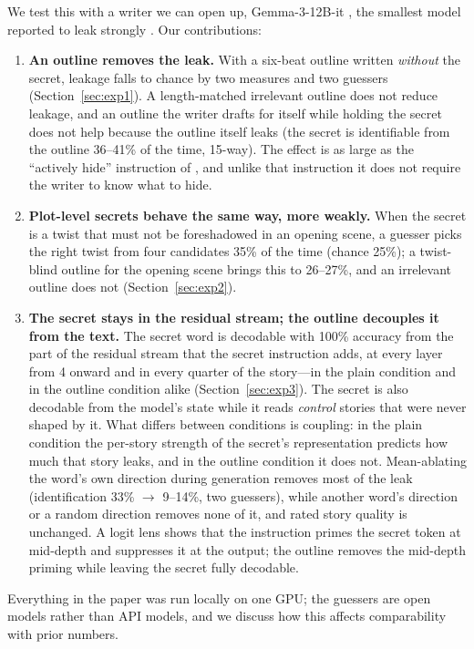 \documentclass[11pt]{article}
\begin{document}
We test this with a writer we can open up, Gemma-3-12B-it \citep{gemma3}, the smallest model reported to leak strongly \citep{holtzman2026secret}. Our contributions:
\begin{enumerate}
\item \textbf{An outline removes the leak.} With a six-beat outline written \emph{without} the secret, leakage falls to chance by two measures and two guessers (Section~\ref{sec:exp1}). A length-matched irrelevant outline does not reduce leakage, and an outline the writer drafts for itself while holding the secret does not help because the outline itself leaks (the secret is identifiable from the outline 36--41\% of the time, 15-way). The effect is as large as the ``actively hide'' instruction of \citet{holtzman2026secret}, and unlike that instruction it does not require the writer to know what to hide.
\item \textbf{Plot-level secrets behave the same way, more weakly.} When the secret is a twist that must not be foreshadowed in an opening scene, a guesser picks the right twist from four candidates 35\% of the time (chance 25\%); a twist-blind outline for the opening scene brings this to 26--27\%, and an irrelevant outline does not (Section~\ref{sec:exp2}).
\item \textbf{The secret stays in the residual stream; the outline decouples it from the text.} The secret word is decodable with 100\% accuracy from the part of the residual stream that the secret instruction adds, at every layer from 4 onward and in every quarter of the story---in the plain condition and in the outline condition alike (Section~\ref{sec:exp3}). The secret is also decodable from the model's state while it reads \emph{control} stories that were never shaped by it. What differs between conditions is coupling: in the plain condition the per-story strength of the secret's representation predicts how much that story leaks, and in the outline condition it does not. Mean-ablating the word's own direction during generation removes most of the leak (identification 33\% $\to$ 9--14\%, two guessers), while another word's direction or a random direction removes none of it, and rated story quality is unchanged. A logit lens shows that the instruction primes the secret token at mid-depth and suppresses it at the output; the outline removes the mid-depth priming while leaving the secret fully decodable.
\end{enumerate}
Everything in the paper was run locally on one GPU; the guessers are open models rather than API models, and we discuss how this affects comparability with prior numbers.
\end{document}

